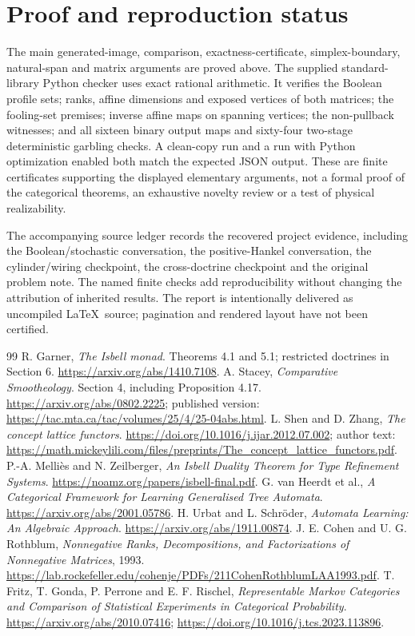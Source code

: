 \documentclass[11pt]{article}
\begin{document}
\appendix
\section{Proof and reproduction status}

The main generated-image, comparison, exactness-certificate, simplex-boundary, natural-span and matrix arguments are proved above. The supplied standard-library Python checker uses exact rational arithmetic. It verifies the Boolean profile sets; ranks, affine dimensions and exposed vertices of both matrices; the fooling-set premises; inverse affine maps on spanning vertices; the non-pullback witnesses; and all sixteen binary output maps and sixty-four two-stage deterministic garbling checks. A clean-copy run and a run with Python optimization enabled both match the expected JSON output. These are finite certificates supporting the displayed elementary arguments, not a formal proof of the categorical theorems, an exhaustive novelty review or a test of physical realizability.

The accompanying source ledger records the recovered project evidence, including the Boolean/stochastic conversation, the positive-Hankel conversation, the cylinder/wiring checkpoint, the cross-doctrine checkpoint and the original problem note. The named finite checks add reproducibility without changing the attribution of inherited results. The report is intentionally delivered as uncompiled \LaTeX\ source; pagination and rendered layout have not been certified.

\begin{thebibliography}{99}
 R. Garner, \emph{The Isbell monad}. Theorems 4.1 and 5.1; restricted doctrines in Section 6. \url{https://arxiv.org/abs/1410.7108}.
 A. Stacey, \emph{Comparative Smootheology}. Section 4, including Proposition 4.17. \url{https://arxiv.org/abs/0802.2225}; published version: \url{https://tac.mta.ca/tac/volumes/25/4/25-04abs.html}.
 L. Shen and D. Zhang, \emph{The concept lattice functors}. \url{https://doi.org/10.1016/j.ijar.2012.07.002}; author text: \url{https://math.mickeylili.com/files/preprints/The_concept_lattice_functors.pdf}.
 P.-A. Melli\`es and N. Zeilberger, \emph{An Isbell Duality Theorem for Type Refinement Systems}. \url{https://noamz.org/papers/isbell-final.pdf}.
 G. van Heerdt et al., \emph{A Categorical Framework for Learning Generalised Tree Automata}. \url{https://arxiv.org/abs/2001.05786}.
 H. Urbat and L. Schr\"oder, \emph{Automata Learning: An Algebraic Approach}. \url{https://arxiv.org/abs/1911.00874}.
 J. E. Cohen and U. G. Rothblum, \emph{Nonnegative Ranks, Decompositions, and Factorizations of Nonnegative Matrices}, 1993. \url{https://lab.rockefeller.edu/cohenje/PDFs/211CohenRothblumLAA1993.pdf}.
 T. Fritz, T. Gonda, P. Perrone and E. F. Rischel, \emph{Representable Markov Categories and Comparison of Statistical Experiments in Categorical Probability}. \url{https://arxiv.org/abs/2010.07416}; \url{https://doi.org/10.1016/j.tcs.2023.113896}.
\end{thebibliography}
\end{document}
